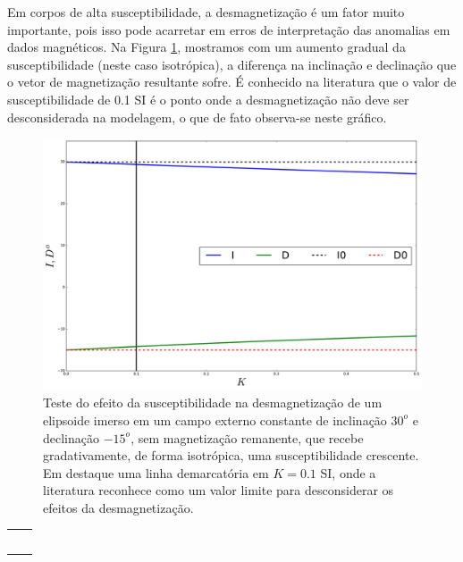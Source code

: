 Em corpos de alta susceptibilidade, a desmagnetização é um fator muito importante, pois isso pode acarretar em erros de interpretação das anomalias em dados magnéticos. Na Figura \ref{fig:test_k_triaxial}, mostramos com um aumento gradual da susceptibilidade (neste caso isotrópica), a diferença na inclinação e declinação que o vetor de magnetização resultante sofre. É conhecido na literatura que o valor de susceptibilidade de 0.1 SI é o ponto onde a desmagnetização não deve ser desconsiderada na modelagem, o que de fato observa-se neste gráfico.

\begin{figure}[hbt!]
	\centering \includegraphics[width=15 cm,height=10 cm]{figures/test_k_triaxial}
	\caption[Teste do efeito da susceptibilidade na desmagnetização de um elipsoide imerso em um campo externo constante de inclinação 
	$30^{o}$ e declinação $-15^{o}$.]{Teste do efeito da susceptibilidade na desmagnetização de um elipsoide imerso em um campo externo constante de inclinação	$30^{o}$ e declinação $-15^{o}$, sem magnetização remanente, que recebe gradativamente, de forma isotrópica,
		uma susceptibilidade crescente. Em destaque uma linha demarcatória em $K=0.1$ SI, onde a literatura reconhece como um valor limite 
		para desconsiderar os efeitos da desmagnetização.}
	\label{fig:test_k_triaxial}
\end{figure}

\begin{table}[h!]
	\begin{center}
		\begin{tabular}{lc}
			
			&  \\
			& \\
			& \\
			& \\
			& \\
			
		\end{tabular}
	\end{center}
\end{table}


